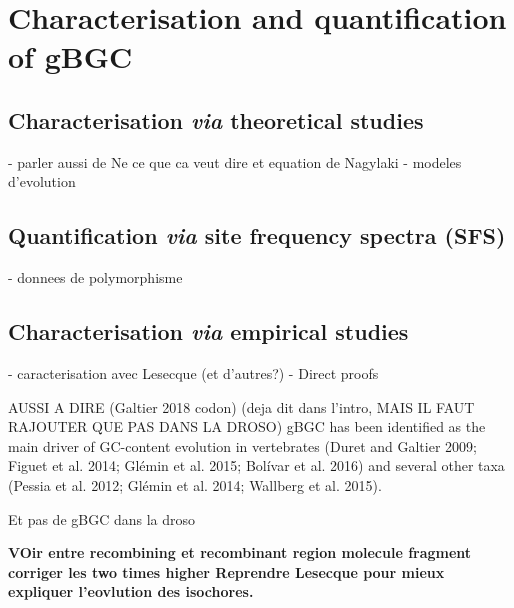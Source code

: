 \section{Characterisation and quantification of gBGC}
\subsection{Characterisation \textit{via} theoretical studies}
- parler aussi de Ne ce que ca veut dire et equation de Nagylaki
- modeles d'evolution
\subsection{Quantification \textit{via} site frequency spectra (SFS)}
- donnees de polymorphisme
\subsection{Characterisation \textit{via} empirical studies}
- caracterisation avec Lesecque (et d'autres?)
- Direct proofs


AUSSI A DIRE (Galtier 2018 codon) (deja dit dans l'intro, MAIS IL FAUT RAJOUTER QUE PAS DANS LA DROSO)
gBGC has been identified as the main driver of GC-content evolution in vertebrates (Duret and Galtier 2009; Figuet et al. 2014; Glémin et al. 2015; Bolívar et al. 2016) and several other taxa (Pessia et al. 2012; Glémin et al. 2014; Wallberg et al. 2015).

Et pas de gBGC dans la droso



\textbf{VOir entre recombining et recombinant region molecule fragment
corriger les two times higher
Reprendre Lesecque pour mieux expliquer l'eovlution des isochores.}


%

